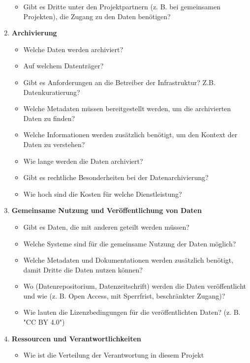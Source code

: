 \begin{enumerate}[start=0, label=\textbf{\arabic*})]
\begin{itemize}
          \item Gibt es Dritte unter den Projektpartnern (z. B. bei gemeinsamen
                Projekten), die Zugang zu den Daten benötigen?
        \end{itemize}
  \item \textbf{Archivierung}
        \begin{itemize}
          \item Welche Daten werden archiviert?
          \item Auf welchem Datenträger?
          \item Gibt es Anforderungen an die Betreiber der Infrastruktur? Z.B.
                Datenkuratierung?
          \item Welche Metadaten müssen bereitgestellt werden, um die
                archivierten Daten zu finden?
          \item Welche Informationen werden zusätzlich benötigt, um den
                Kontext der Daten zu verstehen?
          \item Wie lange werden die Daten archiviert?
          \item Gibt es rechtliche Besonderheiten bei der Datenarchivierung?
          \item Wie hoch sind die Kosten für welche Dienstleistung?
        \end{itemize}
  \item \textbf{Gemeinsame Nutzung und Veröffentlichung von Daten}
        \begin{itemize}
          \item Gibt es Daten, die mit anderen geteilt werden müssen?
          \item Welche Systeme sind für die gemeinsame Nutzung der Daten möglich?
          \item Welche Metadaten und Dokumentationen werden zusätzlich benötigt,
                damit Dritte die Daten nutzen können?
          \item Wo (Datenrepositorium, Datenzeitschrift) werden die Daten
                veröffentlicht und wie (z. B. Open Access, mit Sperrfrist,
                beschränkter Zugang)?
          \item Wie lauten die Lizenzbedingungen für die veröffentlichten Daten?
               (z. B. "CC BY 4.0")
        \end{itemize}
  \item \textbf{Ressourcen und Verantwortlichkeiten}
        \begin{itemize}
          \item Wie ist die Verteilung der Verantwortung in diesem Projekt

\end{itemize}
\end{enumerate}
